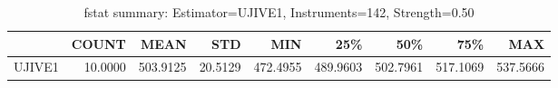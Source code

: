 \begin{table}[ht]
\centering
\caption{fstat summary: Estimator=UJIVE1, Instruments=142, Strength=0.50}
\begin{tabular}{lrrrrrrrr}
\toprule
 & COUNT & MEAN & STD & MIN & 25\% & 50\% & 75\% & MAX \\
\midrule
UJIVE1 & 10.0000 & 503.9125 & 20.5129 & 472.4955 & 489.9603 & 502.7961 & 517.1069 & 537.5666 \\
\bottomrule
\end{tabular}
\end{table}
